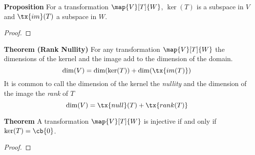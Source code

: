 \documentclass[letterpaper, 10pt]{article}
\begin{document}
\lb
\textbf{Proposition}
\lb
For a transformation $ \map{V}[T]{W} $, $\ker(T)$ is a subspace in $V$
and $\tx{im}(T)$ a subspace in $W$.
\begin{proof}
\end{proof}



\lb
\textbf{Theorem (Rank Nullity)}
\lb
For any transformation $ \map{V}[T]{W} $ the dimensions of the kernel and
the image add to the dimension of the domain.
\[ \dim(V) = \dim (\ker(T)) + \dim(\tx{im(T)}) \]
It is common to call the dimension of the kernel the \emph{nullity}
and the dimension of the image the \emph{rank} of $T$
\[ \dim(V) = \tx{null}(T) + \tx{rank(T)} \]



\lb
\textbf{Theorem}
\lb
A transformation $ \map{V}[T]{W}$ is injective if and only if $\ker(T) = \cb{0}$.
\begin{proof}
\end{proof}
\end{document}
